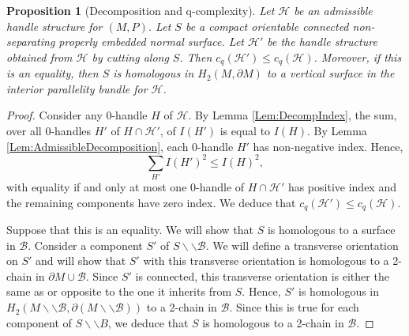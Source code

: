 \documentclass[oneside]{amsart}
\numberwithin{equation}{section}
\theoremstyle{plain}
\newtheorem{proposition}[equation]{Proposition}
\theoremstyle{definition}
\newcommand{\cut}{\backslash\backslash}
\newcommand{\calB}{\mathcal{B}}
\begin{document}
\begin{proposition}[Decomposition and q-complexity]
\label{Prop:ComplexityDecreases}
Let $\mathcal{H}$ be an admissible handle structure for $(M,P)$. Let $S$ be a compact orientable connected non-separating properly embedded normal surface. 
Let $\mathcal{H}'$ be the handle structure obtained from $\mathcal{H}$ by cutting along $S$. Then $c_q(\mathcal{H}') \leq c_q(\mathcal{H})$. Moreover, if this is an equality, then $S$ is homologous in $H_2(M, \partial M)$ to a vertical surface in the interior parallelity bundle for $\mathcal{H}$.
\end{proposition}

\begin{proof}
Consider any 0-handle $H$ of $\mathcal{H}$. By Lemma \ref{Lem:DecompIndex}, the sum, over all 0-handles $H'$ of $H \cap \mathcal{ H}'$, of $I(H')$ is equal to $I(H)$. By Lemma \ref{Lem:AdmissibleDecomposition}, each 0-handle $H'$ has non-negative index. Hence, 
$$\sum_{H'} I(H')^2 \leq I(H)^2,$$
with equality if and only at most one 0-handle of $H \cap \mathcal{H}'$ has positive index and the remaining components have zero index. We deduce that $c_q(\mathcal{H}') \leq c_q(\mathcal{H})$. 

Suppose that this is an equality. We will show that $S$ is homologous to a surface in $\calB$. Consider a component $S'$ of $S \cut \calB$. We will
define a transverse orientation on $S'$ and will show that $S'$ with this transverse orientation is homologous to a 2-chain in $\partial M \cup \calB$. Since $S'$ is connected, this transverse orientation is either the same as or opposite to the one it inherits from $S$. Hence, $S'$ is homologous in $H_2(M \cut \calB, \partial (M \cut \calB))$ to a 2-chain in $\calB$. Since this is true for each component of $S \cut B$, we deduce that $S$ is homologous to a 2-chain in $\calB$.


\end{proof}
\end{document}
